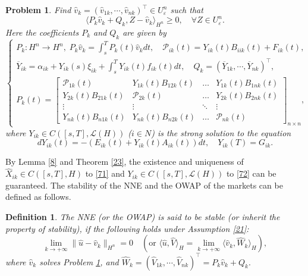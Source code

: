 \documentclass[10pt]{article}
\newtheorem{prob}{Problem}[section]
\newtheorem{defn}{Definition}[section]
\begin{document}
\begin{prob}\label{32}
Find $\widehat{v}_k=(\widehat{v}_{1k},\cdots,\widehat{v}_{nk})^{\top} \in U^n_{\varepsilon}$ such  that
\begin{equation}\label{35}
\langle P_k\widehat{v}_k+Q_k,Z-\widehat{v}_k\rangle_{H^n}\geq 0,\quad \forall Z\in U^n_{\varepsilon}.
\end{equation}
Here  the coefficients  $P_k$ and $Q_k$ are given by
\begin{equation*}
\begin{cases}
P_k:H^n\rightarrow H^n,\;P_k\widehat{v}_k=\int_s^TP_k(t)\widehat{v}_kdt, \quad \mathcal{P}_{ik}(t)=Y_{ik}(t)B_{iik}(t)+F_{ik}(t),\\
\overline{Y}_{ik}=\alpha_{ik}+Y_{ik}(s)\xi_{ik}+\int_s^TY_{ik}(t)f_{ik}(t)dt, \quad Q_k=(\overline{Y}_{1k},\cdots,\overline{Y}_{nk})^{\top},\\
P_k(t)=\begin{bmatrix}
\mathcal{P}_{1k}(t) & Y_{1k}(t)B_{12k}(t)&\dots & Y_{1k}(t)B_{1nk}(t)\\
  Y_{2k}(t)B_{21k}(t)& \mathcal{P}_{2k}(t)&\dots & Y_{2k}(t)B_{2nk}(t)\\
\vdots &\vdots & \ddots&\vdots\\
Y_{nk}(t)B_{n1k}(t)&Y_{nk}(t)B_{n2k}(t)&\dots & \mathcal{P}_{nk}(t)
\end{bmatrix}_{n \times n},
\end{cases}
\end{equation*}
where  $Y_{ik}\in C([s,T],\mathcal{L}(H))$ ($i\in N$) is the strong solution to the equation
\begin{equation}\label{72}
dY_{ik}(t)=-(E_{ik}(t)+Y_{ik}(t)A_{ik}(t))dt,\quad Y_{ik}(T)=G_{ik}.
\end{equation}
\end{prob}
By Lemma  \ref{8} and Theorem \ref{23}, the existence and uniqueness of $\widehat{X}_{ik}\in C([s,T],H)$ to \eqref{71} and $Y_{ik}\in C([s,T],\mathcal{L}(H))$ to \eqref{72} can be guaranteed. The stability of the NNE and the OWAP  of  the markets can be defined as follows.
\begin{defn}
The NNE   (or the OWAP) is said to be stable (or inherit the property of stability), if the following holds under Assumption \ref{21}:
\begin{equation}\label{73}
\lim_{k\rightarrow+\infty}\|\widehat{u}-\widehat{v}_k\|_{H^n}=0 \quad(\mbox{or } \langle \widehat{u},\widehat{V}\rangle_H=\lim_{k\rightarrow+\infty}\langle \widehat{v}_k,\widehat{W}_k\rangle_H),
\end{equation}
 where $\widehat{v}_k$ solves Problem \ref{32}, and $\widehat{W}_k=(\widehat{V}_{1k},\cdots,\widehat{V}_{nk})^{\top}=P_k\widehat{v}_k+Q_k.$
\end{defn}
\end{document}
